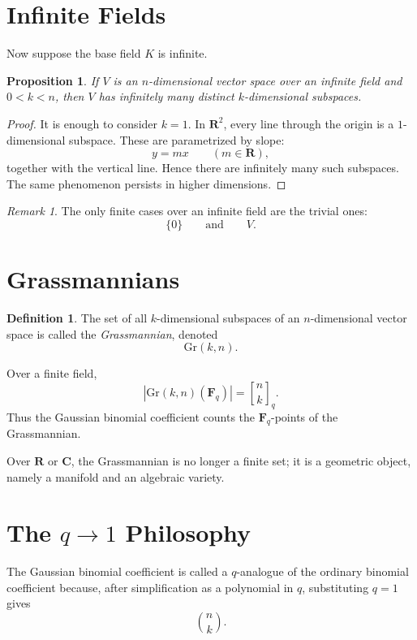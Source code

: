 \documentclass[11pt]{article}
\newtheorem{proposition}[theorem]{Proposition}
\theoremstyle{definition}
\newtheorem{definition}[theorem]{Definition}
\theoremstyle{remark}
\newtheorem{remark}[theorem]{Remark}
\newcommand{\F}{\mathbf{F}}
\newcommand{\R}{\mathbf{R}}
\newcommand{\C}{\mathbf{C}}
\newcommand{\Gr}{\mathrm{Gr}}
\newcommand{\qbinom}[2]{\genfrac{[}{]}{0pt}{}{#1}{#2}_q}
\begin{document}
	\section{Infinite Fields}
	
	Now suppose the base field \(K\) is infinite.
	
	\begin{proposition}
		If \(V\) is an \(n\)-dimensional vector space over an infinite field and \(0<k<n\), then \(V\) has infinitely many distinct \(k\)-dimensional subspaces.
	\end{proposition}
	
	\begin{proof}
		It is enough to consider \(k=1\). In \(\R^2\), every line through the origin is a \(1\)-dimensional subspace. These are parametrized by slope:
		\[
		y=mx \qquad (m\in \R),
		\]
		together with the vertical line. Hence there are infinitely many such subspaces. The same phenomenon persists in higher dimensions.
	\end{proof}
	
	\begin{remark}
		The only finite cases over an infinite field are the trivial ones:
		\[
		\{0\}
		\qquad\text{and}\qquad
		V.
		\]
	\end{remark}
	
	\section{Grassmannians}
	
	\begin{definition}
		The set of all \(k\)-dimensional subspaces of an \(n\)-dimensional vector space is called the \emph{Grassmannian}, denoted
		\[
		\Gr(k,n).
		\]
	\end{definition}
	
	Over a finite field,
	\[
	|\Gr(k,n)(\F_q)|=\qbinom{n}{k}.
	\]
	Thus the Gaussian binomial coefficient counts the \(\F_q\)-points of the Grassmannian.
	
	Over \(\R\) or \(\C\), the Grassmannian is no longer a finite set; it is a geometric object, namely a manifold and an algebraic variety.
	
	\section{The \(q\to 1\) Philosophy}
	
	The Gaussian binomial coefficient is called a \(q\)-analogue of the ordinary binomial coefficient because, after simplification as a polynomial in \(q\), substituting \(q=1\) gives
	\[
	\binom{n}{k}.
	\]
	
\end{document}
